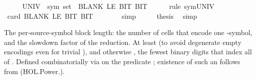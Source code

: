 \begin{isabellebody}
%
\endisadelimproof
%
\isatagproof
{}\isamarkupfalse%
\ {\isacharminus}{\kern0pt}\isanewline
\ \ \isamarkupfalse%
\ {\isachardoublequoteopen}{\isacharparenleft}{\kern0pt}UNIV\ {\isacharcolon}{\kern0pt}{\isacharcolon}{\kern0pt}\ sym{}\ set{\isacharparenright}{\kern0pt}\ {\isacharequal}{\kern0pt}\ {\isacharbraceleft}{\kern0pt}BLANK{}{\isacharcomma}{\kern0pt}\ LE{}{\isacharcomma}{\kern0pt}\ BIT{}{\isacharcomma}{\kern0pt}\ BIT{}{\isacharbraceright}{\kern0pt}{\isachardoublequoteclose}\isanewline
\ \ \ \ \isamarkupfalse%
\ {\isacharparenleft}{\kern0pt}rule\ sym{}{\isacharunderscore}{\kern0pt}UNIV{\isacharparenright}{\kern0pt}\isanewline
\ \ \isamarkupfalse%
\ \isamarkupfalse%
\ {\isachardoublequoteopen}card\ {\isacharbraceleft}{\kern0pt}BLANK{}{\isacharcomma}{\kern0pt}\ LE{}{\isacharcomma}{\kern0pt}\ BIT{}{\isacharcomma}{\kern0pt}\ BIT{}{\isacharbraceright}{\kern0pt}\ {\isacharequal}{\kern0pt}\ {}{\isachardoublequoteclose}\isanewline
\ \ \ \ \isamarkupfalse%
\ simp\isanewline
\ \ \isamarkupfalse%
\ \isamarkupfalse%
\ {\isacharquery}{\kern0pt}thesis\ \isamarkupfalse%
\ simp\isanewline
{}\isamarkupfalse%
%
\endisatagproof
{\isafoldproof}%
%
\isadelimproof
%
\endisadelimproof
%
\isadelimdocument
%
\endisadelimdocument
%
\isatagdocument
%
\isamarkuptrue%
%
\endisatagdocument
{\isafolddocument}%
%
\isadelimdocument
%
\endisadelimdocument
%
\begin{isamarkuptext}%
The per-source-symbol block length: the number of 
  cells that encode one \isa{{\isasymGamma}}-symbol, and the slowdown factor of
  the reduction.  At least  (to avoid degenerate empty
  encodings even for trivial \isa{{\isasymGamma}}), and otherwise
  , the fewest binary digits that
  index all of \isa{{\isasymGamma}}.  Defined combinatorially via 
  on the predicate ; existence of such an
   follows from 
  (HOL.Power.).


\end{isamarkuptext}
\end{isabellebody}
